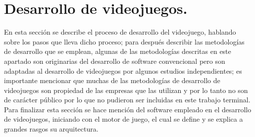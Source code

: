 \section{Desarrollo de videojuegos.}\label{DesVideojuego}
En esta sección se describe el proceso de desarrollo del videojuego, hablando 
sobre los pasos que lleva dicho proceso; para después describir las 
metodologías de desarrollo que se emplean, algunas de las metodologías descritas 
en este apartado son originarias del desarrollo de software convencional pero 
son adaptadas al desarrollo de videojuegos por algunos estudios independientes; es 
importante mencionar que muchas de las metodologías de desarrollo de videojuegos 
son propiedad de las empresas que las utilizan y por lo tanto no son de carácter 
público por lo que no pudieron ser incluidas en este trabajo terminal. Para 
finalizar esta sección se hace mención del software empleado en el desarrollo de 
videojuegos, iniciando con el motor de juego, el cual se define y se explica a 
grandes rasgos su arquitectura.

